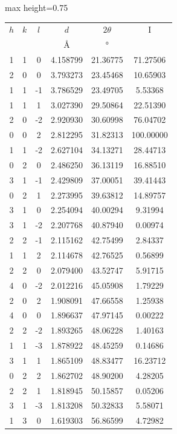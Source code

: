 \documentclass[twoside,a4paper,11pt,addpoints,answers]{exam}%
\begin{document}
\begin{center}
\begin{adjustbox}{max height=0.75\textwidth}
\begin{tabular}{cccccc}
\toprule
$h$ & $k$ & $l$ & $d$ & $2 \theta$ & I \\
 & & & \si{\angstrom} &  \si{\degree} &  \\
\midrule
1 & 1 &  0 &  4.158799 &  21.36775 &  71.27506 \\
2 & 0 &  0 &  3.793273 &  23.45468 &  10.65903 \\
1 & 1 & -1 &  3.786529 &  23.49705 &   5.53368 \\
1 & 1 &  1 &  3.027390 &  29.50864 &  22.51390 \\
2 & 0 & -2 &  2.920930 &  30.60998 &  76.04702 \\
0 & 0 &  2 &  2.812295 &  31.82313 & 100.00000 \\
1 & 1 & -2 &  2.627104 &  34.13271 &  28.44713 \\
0 & 2 &  0 &  2.486250 &  36.13119 &  16.88510 \\
3 & 1 & -1 &  2.429809 &  37.00051 &  39.41443 \\
0 & 2 &  1 &  2.273995 &  39.63812 &  14.89757 \\
3 & 1 &  0 &  2.254094 &  40.00294 &   9.31994 \\
3 & 1 & -2 &  2.207768 &  40.87940 &   0.00974 \\
2 & 2 & -1 &  2.115162 &  42.75499 &   2.84337 \\
1 & 1 &  2 &  2.114678 &  42.76525 &   0.56899 \\
2 & 2 &  0 &  2.079400 &  43.52747 &   5.91715 \\
4 & 0 & -2 &  2.012216 &  45.05908 &   1.79229 \\
2 & 0 &  2 &  1.908091 &  47.66558 &   1.25938 \\
4 & 0 &  0 &  1.896637 &  47.97145 &   0.00222 \\
2 & 2 & -2 &  1.893265 &  48.06228 &   1.40163 \\
1 & 1 & -3 &  1.878922 &  48.45259 &   0.14686 \\
3 & 1 &  1 &  1.865109 &  48.83477 &  16.23712 \\
0 & 2 &  2 &  1.862702 &  48.90200 &   4.28205 \\
2 & 2 &  1 &  1.818945 &  50.15857 &   0.05206 \\
3 & 1 & -3 &  1.813208 &  50.32833 &   5.58071 \\
1 & 3 &  0 &  1.619303 &  56.86599 &   4.72982 \\

\end{tabular}
\end{adjustbox}
\end{center}
\end{document}
